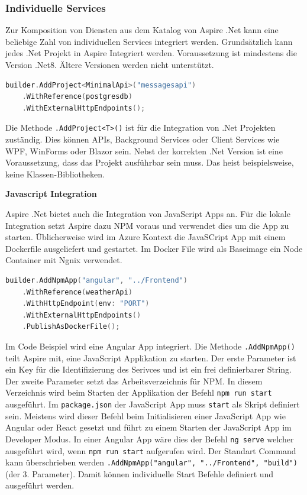         \subsubsection{Individuelle Services}
            Zur Komposition von Diensten aus dem Katalog von Aspire .Net kann eine beliebige Zahl von individuellen Services integriert werden. Grundsätzlich kann jedes .Net Projekt in Aspire Integriert werden. Voraussetzung ist mindestens die Version .Net8. Ältere Versionen werden nicht unterstützt.
            \begin{lstlisting}[language=C, caption=Referenzierung von Diensten für die Komposition]
builder.AddProject<MinimalApi>("messagesapi")
    .WithReference(postgresdb)
    .WithExternalHttpEndpoints();
            \end{lstlisting}
            Die Methode \verb|.AddProject<T>()| ist für die Integration von .Net Projekten zuständig. Dies können APIs, Background Services oder Client Services wie WPF, WinForms oder Blazor sein. Nebst der korrekten .Net Version ist eine Voraussetzung, dass das Projekt ausführbar sein muss. Das heist beispielsweise, keine Klassen-Bibliotheken.

            \textbf{Javascript Integration}
            
            Aspire .Net bietet auch die Integration von JavaScript Apps an. Für die lokale Integration setzt Aspire dazu NPM voraus und verwendet dies um die App zu starten. Üblicherweise wird im Azure Kontext die JavaSCript App mit einem Dockerfile ausgeliefert und gestartet. Im Docker File wird als Baseimage ein Node Container mit Ngnix verwendet.
            \begin{lstlisting}[language=C, caption=Beispiel für die Integration einer Javascript Node App]
builder.AddNpmApp("angular", "../Frontend")
    .WithReference(weatherApi)
    .WithHttpEndpoint(env: "PORT")
    .WithExternalHttpEndpoints()
    .PublishAsDockerFile();
            \end{lstlisting}
            Im Code Beispiel wird eine Angular App integriert. Die Methode \verb|.AddNpmApp()| teilt Aspire mit, eine JavaScript Applikation zu starten. Der erste Parameter ist ein Key für die Identifizierung des Serivces und ist ein frei definierbarer String. Der zweite Parameter setzt das Arbeitsverzeichnis für NPM. In diesem Verzeichnis wird beim Starten der Applikation der Befehl \verb|npm run start| ausgeführt. Im \verb|package.json| der JavaScript App muss \verb|start| als Skript definiert sein. Meistens wird dieser Befehl beim Initialisieren einer JavaScript App wie Angular oder React gesetzt und führt zu einem Starten der JavaScript App im Developer Modus. In einer Angular App wäre dies der Befehl \verb|ng serve| welcher ausgeführt wird, wenn \verb|npm run start| aufgerufen wird. Der Standart Command kann überschrieben werden \verb|.AddNpmApp("angular", "../Frontend", "build")| (der 3. Parameter). Damit können individuelle Start Befehle definiert und ausgeführt werden.

